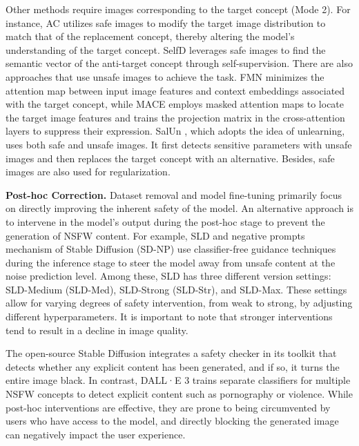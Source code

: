 Other methods require images corresponding to the target concept (Mode 2). For instance, AC \cite{kumari2023ablating-ca} utilizes safe images to modify the target image distribution to match that of the replacement concept, thereby altering the model’s understanding of the target concept. SelfD \cite{li2024self-selfd} leverages safe images to find the semantic vector of the anti-target concept through self-supervision. There are also approaches that use unsafe images to achieve the task. FMN \cite{zhang2024forget-fmn} minimizes the attention map between input image features and context embeddings associated with the target concept, while MACE \cite{lu2024mace} employs masked attention maps to locate the target image features and trains the projection matrix in the cross-attention layers to suppress their expression. SalUn \cite{fan2023salun}, which adopts the idea of unlearning, uses both safe and unsafe images. It first detects sensitive parameters with unsafe images and then replaces the target concept with an alternative. Besides, safe images are also used for regularization.

\noindent\textbf{Post-hoc Correction.}
\label{Posthoc}
Dataset removal and model fine-tuning primarily focus on directly improving the inherent safety of the model. An alternative approach is to intervene in the model’s output during the post-hoc stage to prevent the generation of NSFW content. For example,  SLD \cite{patrick2023safe} and negative prompts mechanism of Stable Diffusion (SD-NP) \cite{ho2022classifier} use classifier-free guidance techniques during the inference stage to steer the model away from unsafe content at the noise prediction level. Among these, SLD has three different version settings: SLD-Medium (SLD-Med), SLD-Strong (SLD-Str), and SLD-Max. These settings allow for varying degrees of safety intervention, from weak to strong, by adjusting different hyperparameters. 
It is important to note that stronger interventions tend to result in a decline in image quality. 

The open-source Stable Diffusion \cite{sd1-4} integrates a safety checker in its toolkit that detects whether any explicit content has been generated, and if so, it turns the entire image black. In contrast, DALL·E 3 trains separate classifiers for multiple NSFW concepts to detect explicit content such as pornography or violence. While post-hoc interventions are effective, they are prone to being circumvented by users who have access to the model, and directly blocking the generated image can negatively impact the user experience.  

